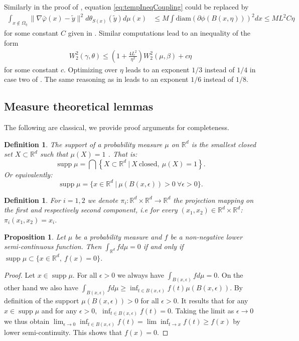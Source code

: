 \documentclass[11pt]{article}
\newtheorem{definition}[lemma]{Definition}
\newtheorem{proposition}[lemma]{Proposition}
\DeclareMathOperator{\supp}{supp}
\newcommand{\R}{\mathbb R}
\newcommand{\1}{\mathbbm{1}}
\numberwithin{equation}{section}
\begin{document}
Similarly in the proof of , equation \eqref{eq:tempIneqCoupling} could be replaced by
\begin{align}
	\label{eq:tempIneqCouplingBis}
	\int_{x \not\in\Omega_\eta} \|\nabla \bar\varphi(x) - \tilde{y}\|^2 d\theta_{S(x)} (\tilde{y}) d\mu(x)& \leq M\int \mathrm{diam}(\partial \phi(B(x,\eta)))^2 d x \nonumber \leq ML^2C \eta 
\end{align}
for some constant $C$ given in \cite[Corollary 2.2]{carlier2025quantitative}. Similar computations lead to an inequality of the form
\begin{align*}
	W_2^2(\gamma,\theta) \leq \left( 1 + \frac{4L^2}{\eta^2} \right) W_2^2(\mu,\beta) + c \eta
\end{align*}
for some constant $c$. Optimizing over $\eta$ leads to an exponent $1/3$ instead of $1/4$ in case two of . The same reasoning as in  leads to an exponent $1/6$ instead of $1/8$. 

\subsection{Measure theoretical lemmas}
The following are classical, we provide proof arguments for completeness.
\begin{definition}
 The support of a probability measure $\mu$ on $\R^d$  is the smallest closed set $X\subset\R^d$ such that  $\mu(X)=1$ . That is:
 \begin{equation*}
    \supp \mu=\bigcap\left\{X\subset\R^d\:|\:X\:\text{closed},\:\mu(X)=1\right\}.
 \end{equation*}
 Or equivalently: 
 \begin{equation*}
    \supp \mu= \{x\in \R^d\:|\:\mu(B(x,\epsilon))>0\:\forall\epsilon>0\}.
 \end{equation*}
\end{definition}
\begin{definition}
For $i=1,2$ we denote $\pi_{i}:\R^d\times \R^d\longrightarrow\R^d$ the projection mapping on the first and respectively second component, \textit{i.e} for every $(x_1,x_2)\in\R^d\times \R^d$: $\pi_i(x_1,x_2)=x_i$.
\end{definition}
\begin{proposition}
    Let $\mu$ be a probability measure and $f$ be a non-negative lower semi-continuous function. Then $\int_{\R^d}fd\mu=0$ if and only if $\supp \mu\subset \{x\in\R^d,\:f(x)=0\}$.
    \label{prop:measure_theory}
\end{proposition}
\begin{proof}
    Let $x\in\supp \mu$. For all $\epsilon>0$ we always have $\int_{B(x,\epsilon)}fd\mu=0$. On the other hand we also have $\int_{B(x,\epsilon)}fd\mu\geq \inf_{t\in B(x,\epsilon)}f(t)\mu(B(x,\epsilon))$. By definition of the support $\mu(B(x,\epsilon))>0$ for all $\epsilon>0$. It results that for any $x\in \supp \mu$ and for any $\epsilon>0,$ $\inf_{t\in B(x,\epsilon)}f(t)=0$. Taking the limit as $\epsilon\longrightarrow0$ we thus obtain $\lim_{\epsilon\rightarrow 0}\inf_{t\in B(x,\epsilon)}f(t)=\lim\inf_{t\rightarrow x}f(t)\geq f(x)$ by lower semi-continuity. This shows that $f(x)=0$.
    \end{proof}
\end{document}
